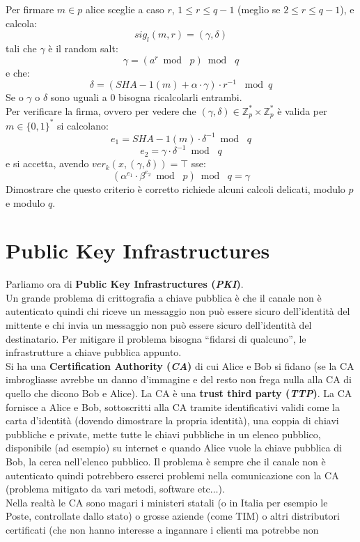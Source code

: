 \documentclass[a4paper,12pt, oneside]{book}
\begin{document}
Per firmare $m\in p$ alice sceglie a caso $r$, $1\leq r\leq q-1$ (meglio se
$2\leq r\leq q-1$), e calcola:
\[sig_l(m,r)=(\gamma,\delta)\]
tali che $\gamma$ è il random salt:
\[\gamma=(a^r\bmod\,\,p)\bmod\,\,q\]
e che:
\[\delta=(SHA-1(m)+\alpha\cdot\gamma)\cdot r^{-1}\,\,\bmod q\]
Se o $\gamma$ o $\delta$ sono uguali a 0 bisogna ricalcolarli entrambi.\\
Per verificare la firma, ovvero per vedere che $(\gamma,\delta)\in
\mathbb{Z}_p^*\times \mathbb{Z}_p^*$ è valida per $m\in\{0,1\}^*$ si calcolano:
\[e_1=SHA-1(m)\cdot \delta^{-1}\bmod\,\,q\]
\[e_2=\gamma\cdot \delta^{-1}\bmod\,\,q\]
e si accetta, avendo $ver_k(x,(\gamma,\delta))=\top$ sse:
\[(\alpha^{e_1}\cdot \beta^{e_2}\bmod\,\,p)\bmod\,\,q=\gamma\]
Dimostrare che questo criterio è corretto richiede alcuni calcoli
delicati, modulo $p$ e modulo $q$.
\section{Public Key Infrastructures}
Parliamo ora di \textbf{Public Key Infrastructures (\textit{PKI})}.\\
Un grande problema di crittografia a chiave pubblica è che il canale non è
autenticato quindi chi riceve un messaggio non può essere sicuro dell'identità
del mittente e chi invia un messaggio non può essere sicuro dell'identità del
destinatario. Per mitigare il problema bisogna ``fidarsi di qualcuno'', le
infrastrutture a chiave pubblica appunto. \\
Si ha una \textbf{Certification Authority (\textit{CA})} di cui Alice e Bob si
fidano (se la CA imbrogliasse avrebbe un danno d'immagine e del resto non frega
nulla alla CA di quello che dicono Bob e Alice). La CA è una \textbf{trust third
  party (\textit{TTP})}. La CA fornisce a Alice e Bob, sottoscritti alla CA
tramite identificativi validi come la carta d'identità (dovendo dimostrare la
propria identità), una coppia di chiavi
pubbliche e private, mette tutte le chiavi pubbliche in un elenco pubblico,
disponibile (ad esempio) su internet e quando Alice vuole la chiave pubblica di
Bob, la cerca nell'elenco pubblico. Il problema è sempre che il canale non è
autenticato quindi potrebbero esserci problemi nella comunicazione con la CA
(problema mitigato da vari metodi, software etc$\ldots$).\\
Nella realtà le CA sono magari i ministeri statali (o in Italia per esempio le
Poste, controllate dallo stato) o grosse aziende (come TIM) o altri distributori
certificati (che non hanno interesse a ingannare i clienti ma potrebbe non
\end{document}
